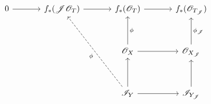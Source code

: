 \[
\begin{tikzcd}[column sep=3.4em, row sep=3.3em]
 0 \arrow[r]
 &
 f_*(\mathscr J\mathscr O_T) \arrow[r]
 &
 f_*(\mathscr O_T) \arrow[r]
 &
 f_*(\mathscr O_{T_{\mathscr J}})
 \\
 &&
 \mathscr O_X
   \arrow[r]
   \arrow[u,"\phi"']
 &
 \mathscr O_{X_{\mathscr J}}
   \arrow[u,"\phi_{\mathscr J}"']
 \\
 &&
 \mathscr I_Y
   \arrow[r]
   \arrow[u]
   \arrow[luu,dashed,"\phi"]
 &
 \mathscr I_{Y_{\mathscr J}}
   \arrow[u]
\end{tikzcd}
\]
